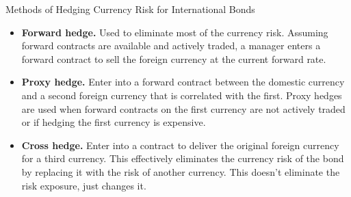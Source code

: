 \documentclass[../custom]{flashcards}
\begin{document}
\begin{flashcard}{Methods of Hedging Currency Risk for International Bonds}
    \begin{itemize}
        \item \textbf{Forward hedge.} Used to eliminate most of the currency risk. Assuming forward contracts are available and actively traded, a manager enters a forward contract to sell the foreign currency at the current forward rate.
        \item \textbf{Proxy hedge.} Enter into a forward contract between the domestic currency and a second foreign currency that is correlated with the first. Proxy hedges are used when forward contracts on the first currency are not actively traded or if hedging the first currency is expensive.
        \item \textbf{Cross hedge.} Enter into a contract to deliver the original foreign currency for a third currency. This effectively eliminates the currency risk of the bond by replacing it with the risk of another currency. This doesn't eliminate the risk exposure, just changes it.
    \end{itemize}
\end{flashcard}
\end{document}

